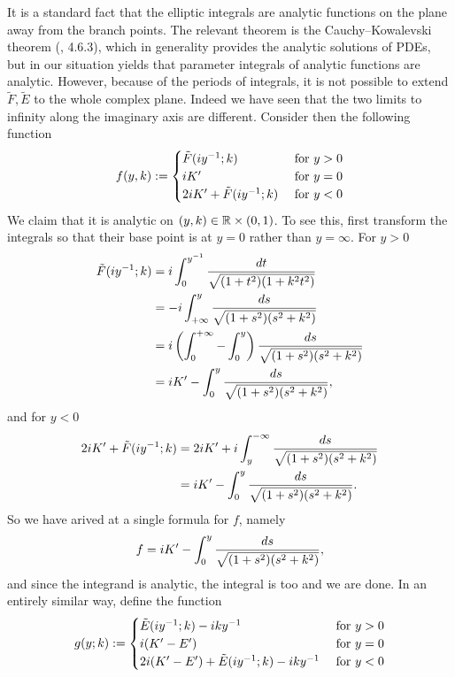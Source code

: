 It is a standard fact that the elliptic integrals are analytic functions on the plane away from the branch points. The relevant theorem is the Cauchy–Kowalevski theorem (\cite{Evans1998}, 4.6.3), which in generality provides the analytic solutions of PDEs, but in our situation yields that parameter integrals of analytic functions are analytic. However, because of the periods of integrals, it is not possible to extend $\tilde F, \tilde E$ to the whole complex plane. Indeed we have seen that the two limits to infinity along the imaginary axis are different. Consider then the following function
\[
f(y, k) :=
\begin{cases}
\tilde F(i y^{-1}; k)             & \text{ for } y > 0 \\
i K'                              & \text{ for } y = 0 \\
2i K' + \tilde F(i y^{-1}; k)   & \text{ for } y < 0
\end{cases}
\]
We claim that it is analytic on $(y,k) \in \mathbb{R}\times (0,1)$. To see this, first transform the integrals so that their base point is at $y=0$ rather than $y=\infty$. For $y>0$
\begin{align*}
\tilde F(i y^{-1}; k)
&= i \int_0^{y^{-1}} \frac{dt}{\sqrt{(1+t^2)(1+k^2t^2)}} \\
&= -i \int_{+\infty}^{y} \frac{ds}{\sqrt{(1+s^2)(s^2+k^2)}} \\
&= i \left(\int_0^{+\infty} - \int_0^y \right) \frac{ds}{\sqrt{(1+s^2)(s^2+k^2)}} \\
&= i K' - \int_0^y \frac{ds}{\sqrt{(1+s^2)(s^2+k^2)}},
\end{align*}
and for $y < 0$
\begin{align*}
2i K' + \tilde F(i y^{-1}; k)
&= 2i K' + i \int_y^{-\infty} \frac{ds}{\sqrt{(1+s^2)(s^2+k^2)}} \\
&= i K' - \int_0^y \frac{ds}{\sqrt{(1+s^2)(s^2+k^2)}}.
\end{align*}
So we have arived at a single formula for $f$, namely
\[
f = i K' - \int_0^y \frac{ds}{\sqrt{(1+s^2)(s^2+k^2)}},
\]
and since the integrand is analytic, the integral is too and we are done. In an entirely similar way, define the function
\[
g(y;k) :=
\begin{cases}
\tilde E(i y^{-1}; k) - i ky^{-1}             & \text{ for } y > 0 \\
i (K'-E')                                       & \text{ for } y = 0 \\
2i (K'-E') + \tilde E(i y^{-1}; k)  - i ky^{-1}  & \text{ for } y < 0
\end{cases}
\]
